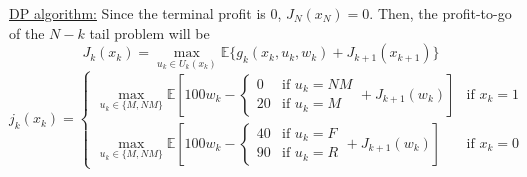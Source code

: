\documentclass[11pt, english]{article}
\begin{document}
\underline{DP algorithm:}
Since the terminal profit is 0, $J_N(x_N)=0$. Then, the profit-to-go of the $N-k$ tail problem will be 
$$J_k(x_k)=\underset{u_k\in U_k(x_k)}{\max}\mathbb{E}\{g_k(x_k,u_k,w_k)+J_{k+1}(x_{k+1})\}$$
$$j_k(x_k)=\left\{\begin{array}{ll}
\underset{u_k\in\{M,NM\}}{\max}\mathbb{E}\left[100w_k-\left\{\begin{array}{ll}
0 & \text{if }u_k=NM\\
20 & \text{if }u_k=M
\end{array}\right.+J_{k+1}(w_k)\right] & \text{if }x_k=1\\
\underset{u_k\in\{M,NM\}}{\max}\mathbb{E}\left[100w_k-\left\{\begin{array}{ll}
40 & \text{if }u_k=F\\
90 & \text{if }u_k=R
\end{array}\right.+J_{k+1}(w_k)\right] & \text{if }x_k=0
\end{array}\right.$$
\end{document}
